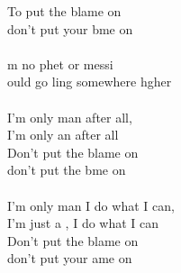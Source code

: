 \begin{cancion}
	To put the blame on  \\
	don't put your bme on   \\
\jump\\
	m no phet or messi  \\
	ould go ling somewhere hgher\\
\jump\\
	I'm only man after all, \\
	I'm only an after all\\
	Don't put the blame on  \\
	don't put the  bme on \\
\jump\\
	I'm only man I do what I can, \\
	I'm just a , I do what I can\\
	Don't put the blame on  \\
	don't put your ame on \\
\end{cancion}%
